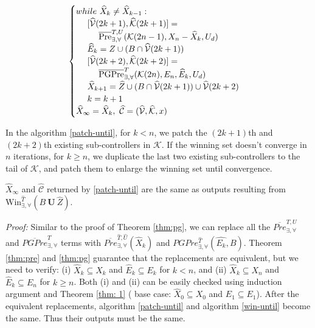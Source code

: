 {\begin{align}
\begin{split}
\begin{cases}
{\color{black} while \ \widehat{X}_{k}\not=\widehat{X}_{k-1}:}\\
\ \ \ \ [\widehat{\mathcal{V}}(2k+1),\widehat{\mathcal{K}}(2k+1)] = \\ \ \ \ \ \ \ \ \ \overline{\text{Pre}}_{\exists,\forall}^{T,U}(\mathcal{K}(2n-1),X_{n}-\widehat{X}_{k}, U_d)\\
\ \ \ \ \widehat{E}_k =  Z\cup (B\cap \widehat{\mathcal{V}}(2k+1))\\
\ \ \ \ [\widehat{\mathcal{V}}(2k+2),\widehat{\mathcal{K}}(2k+2)] =\\ 
\ \ \ \ \ \ \ \ \overline{\text{PGPre}}_{\exists,\forall}^{T}(\mathcal{K}(2n),E_n, \widehat{E}_k,U_d)\\
\ \ \ \ \widehat{X}_{k+1} =\widehat{Z}\cup (B\cap \widehat{\mathcal{V}}(2k+1)) \cup \widehat{\mathcal{V}}(2k+2)\\
\ \ \ \ {\color{black} k=k+1}\\
\widehat{X}_\infty = \widehat{X}_k,\ \widehat{\mathcal{C}} = (\widehat{\mathcal{V}},\widehat{\mathcal{K}},x)
\end{cases} \label{patch-until}
\end{split}
\end{align}}

In the algorithm \eqref{patch-until}, for $ k <n $, we patch the $ (2k+1) $th and $ (2k+2) $th existing sub-controllers in $ \mathcal{K} $. If the winning set doesn't converge in $ n $ iterations, for $ k\geq n $, we duplicate the last two existing sub-controllers to the tail of $ \mathcal{K} $, and patch them to enlarge the winning set until convergence. 
\begin{theorem}
	$ \widehat{X}_\infty $ and $ \widehat{\mathcal{C}} $ returned by \eqref{patch-until} are the same as outputs resulting from $ \text{Win}_{\exists,\forall}^{\widehat{T}}(B\mathbf{\ U\ }\widehat{Z}). $\label{thm:until}	
\end{theorem}

\emph{Proof:} Similar to the proof of Theorem \ref{thm:pg}, we can replace all the $ \overline{Pre}_{\exists,\forall}^{T,U} $ and $ \overline{PGPre}_{\exists,\forall}^{T} $ terms with $ \overline{Pre}_{\exists,\forall}^{\widehat{T},\widehat{U}}(\widehat{X}_k) $ and $PGPre_{\exists,\forall}^{\widehat{T}}(\widehat{E_k},B)$. Theorem \ref{thm:pre} and \ref{thm:pg} guarantee that the replacements are equivalent, but we need to verify: (i) $ \widehat{X}_k \subseteq X_k $ and $ \widehat{E}_k \subseteq E_k $ for $ k < n $, and (ii) $ \widehat{X}_k \subseteq X_n $ and $ \widehat{E}_k \subseteq E_n $ for $ k\geq n $. Both (i) and (ii) can be easily checked using induction argument and Theorem \ref{thm: 1} ( base case: $ \widehat{X}_0\subseteq X_0 $ and $ \widehat{E}_1\subseteq E_1 $). After the equivalent replacements, algorithm \eqref{patch-until} and algorithm \eqref{win-until} become the same. Thus their outputs must be the same. \QEDB

